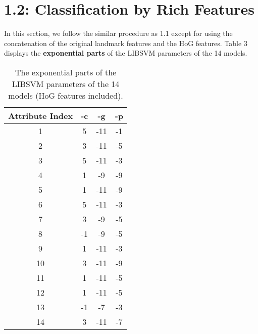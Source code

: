 \documentclass[10pt]{article}
\begin{document}
\section*{\small{1.2: Classification by Rich Features}}
	In this section, we follow the similar procedure as 1.1 except for using the concatenation of the original landmark features and the HoG features. Table 3 displays the \textbf{exponential parts} of the LIBSVM parameters of the 14 models. \\
	\begin{table}[ht]
 		\centering
 		\begin{tabular}{|c|c|c|c|}
		\hline
		\textbf{Attribute Index} & \textbf{-c} & \textbf{-g} & \textbf{-p} \\ \hline
		1 & 5 & -11 & -1 \\ \hline
		2 & 3 & -11 & -5 \\ \hline
		3 & 5 & -11 & -3  \\ \hline
		4 & 1 & -9 & -9 \\ \hline
		5 & 1 & -11 & -9 \\ \hline
		6 & 5 & -11 & -3 \\ \hline
		7 & 3 & -9 & -5 \\ \hline
		8 & -1 & -9 & -5 \\ \hline
		9 & 1 & -11 & -3 \\ \hline
		10 & 3 & -11 & -9 \\ \hline
		11 & 1 & -11 & -5 \\ \hline
		12 & 1 & -11 & -5 \\ \hline
		13 & -1 & -7 & -3 \\ \hline
		14 & 3 & -11 & -7 \\ \hline
 		\end{tabular}
		\caption{The exponential parts of the LIBSVM parameters of the 14 models (HoG features included).}\label{tab3}
	\end{table}\\
	
\end{document}
